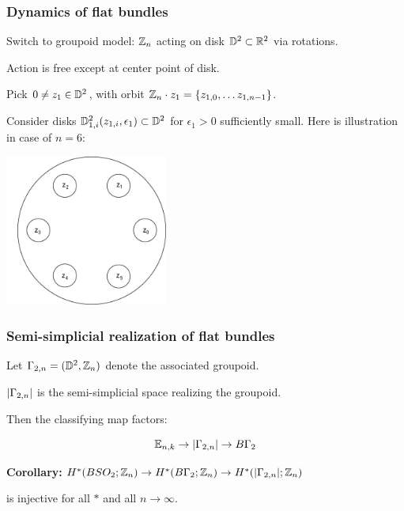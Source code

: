 \documentclass{beamer}
\begin{document}
\frame
{
  \frametitle{Dynamics of flat bundles}

Switch to groupoid model:
  ${\mathbb Z}_n$ acting on disk ${\mathbb D}^2 \subset {\mathbb R}^2$ via rotations.
 
 \medskip
  Action is free except at center point of disk.
 \medskip
 
 Pick $0 \ne z_1 \in {\mathbb D}^2$, with orbit ${\mathbb Z}_n \cdot z_1 = \{z_{1,0}, \ldots z_{1,n-1}\}$. 
 
Consider disks ${\mathbb D}^2_{1,i} (z_{1,i},\epsilon_1) \subset {\mathbb D}^2$ for $\epsilon_1 > 0$ sufficiently small.
Here is illustration in case of $n = 6$:
\begin{center}
\includegraphics[width=0.4\textwidth]{pix/pants7.png}
\label{figure-originalhirsch}
\end{center}

  \vfill
  
}
  
 \frame
{
  \frametitle{Semi-simplicial realization of flat bundles}

Let $\Gamma_{2,n} = ({\mathbb D}^2, {\mathbb Z}_n)$   denote the associated groupoid.

 \medskip
 
 $| \Gamma_{2,n}| $ is the semi-simplicial space realizing the groupoid. 
 
 \medskip
 
 Then the classifying map factors:
 
 \medskip
 
$$ {\mathbb E}_{n,k} \to | \Gamma_{2,n}| \to B\Gamma_2$$
 
 {\bf Corollary:} 
  $H^*(BSO_2 ; {\mathbb Z}_n) \to H^*(B\Gamma_2 ; {\mathbb Z}_n) \to H^*(| \Gamma_{2,n}| ; {\mathbb Z}_n)$ 
  
  is injective for all $*$ and all $n \to \infty$.
  
  \vfill
  
}
\end{document}
